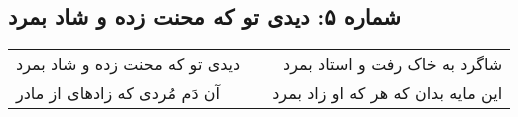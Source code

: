 \begin{center}
\section*{شماره ۵: دیدی تو که محنت زده و شاد بمرد}
\label{sec:005}
\begin{longtable}{l p{0.5cm} r}
دیدی تو که محنت زده و شاد بمرد
&&
شاگرد به خاک رفت و استاد بمرد
\\
آن دَم مُردی که زادهای از مادر
&&
این مایه بدان که هر که او زاد بمرد
\\
\end{longtable}
\end{center}
